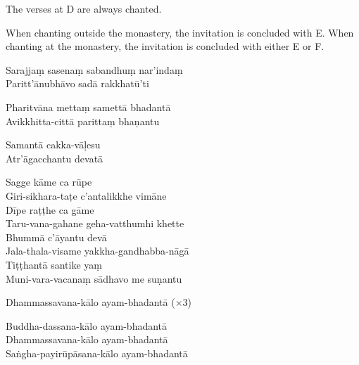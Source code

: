 The verses at D are always chanted.

When chanting outside the monastery, the invitation is concluded with E. When
chanting at the monastery, the invitation is concluded with either E or F.

\begin{paritta}


%
Sarajjaṃ sasenaṃ sabandhuṃ nar'indaṃ\\
Paritt'ānubhāvo sadā rakkhatū'ti

%
Pharitvāna mettaṃ samettā bhadantā\\
Avikkhitta-cittā parittaṃ bhaṇantu

%
Samantā cakka-vāḷesu\\
Atr'āgacchantu devatā

%
Sagge kāme ca rūpe\\
Giri-sikhara-taṭe c'antalikkhe vimāne\\
Dīpe raṭṭhe ca gāme\\
Taru-vana-gahane geha-vatthumhi khette\\
Bhummā c'āyantu devā\\
Jala-thala-visame yakkha-gandhabba-nāgā\\
Tiṭṭhantā santike yaṃ\\
Muni-vara-vacanaṃ sādhavo me suṇantu

%
Dhammassavana-kālo ayam-bhadantā (×3)


%
Buddha-dassana-kālo ayam-bhadantā\\
Dhammassavana-kālo ayam-bhadantā\\
Saṅgha-payirūpāsana-kālo ayam-bhadantā
\end{paritta}

